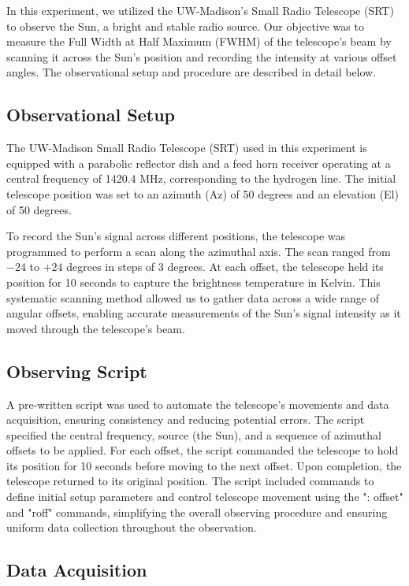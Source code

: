 \documentclass[linenumbers,twocolumn]{aastex631}
\begin{document}
In this experiment, we utilized the UW-Madison's Small Radio Telescope (SRT) to observe the Sun, a bright and stable radio source. Our objective was to measure the Full Width at Half Maximum (FWHM) of the telescope’s beam by scanning it across the Sun’s position and recording the intensity at various offset angles. The observational setup and procedure are described in detail below.

\subsection{Observational Setup}

The UW-Madison Small Radio Telescope (SRT) used in this experiment is equipped with a parabolic reflector dish and a feed horn receiver operating at a central frequency of 1420.4 MHz, corresponding to the hydrogen line. The initial telescope position was set to an azimuth (Az) of 50 degrees and an elevation (El) of 50 degrees.

To record the Sun’s signal across different positions, the telescope was programmed to perform a scan along the azimuthal axis. The scan ranged from \(-24\) to \(+24\) degrees in steps of 3 degrees. At each offset, the telescope held its position for 10 seconds to capture the brightness temperature in Kelvin. This systematic scanning method allowed us to gather data across a wide range of angular offsets, enabling accurate measurements of the Sun’s signal intensity as it moved through the telescope’s beam.

\subsection{Observing Script}

A pre-written script was used to automate the telescope’s movements and data acquisition, ensuring consistency and reducing potential errors. The script specified the central frequency, source (the Sun), and a sequence of azimuthal offsets to be applied. For each offset, the script commanded the telescope to hold its position for 10 seconds before moving to the next offset. Upon completion, the telescope returned to its original position.
The script included commands to define initial setup parameters and control telescope movement using the ": offset" and "roff" commands, simplifying the overall observing procedure and ensuring uniform data collection throughout the observation.

\subsection{Data Acquisition}
\end{document}
